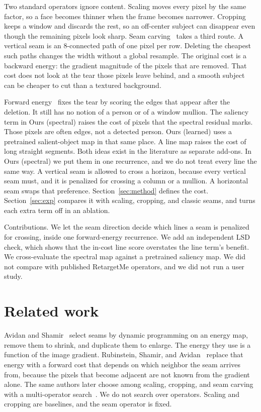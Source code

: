 \documentclass[10pt,twocolumn,letterpaper]{article}
\begin{document}
Two standard operators ignore content.
Scaling moves every pixel by the same factor, so a face becomes thinner when the frame becomes narrower.
Cropping keeps a window and discards the rest, so an off-center subject can disappear even though the remaining pixels look sharp.
Seam carving~\cite{avidan2007seam} takes a third route.
A vertical seam is an 8-connected path of one pixel per row.
Deleting the cheapest such paths changes the width without a global resample.
The original cost is a backward energy: the gradient magnitude of the pixels that are removed.
That cost does not look at the tear those pixels leave behind, and a smooth subject can be cheaper to cut than a textured background.

Forward energy~\cite{rubinstein2008improved} fixes the tear by scoring the edges that appear after the deletion.
It still has no notion of a person or of a window mullion.
The saliency term in Ours (spectral) raises the cost of pixels that the spectral residual marks. Those pixels are often edges, not a detected person.
Ours (learned) uses a pretrained salient-object map in that same place.
A line map raises the cost of long straight segments.
Both ideas exist in the literature as separate add-ons.
In Ours (spectral) we put them in one recurrence, and we do not treat every line the same way.
A vertical seam is allowed to cross a horizon, because every vertical seam must, and it is penalized for crossing a column or a mullion.
A horizontal seam swaps that preference.
Section~\ref{sec:method} defines the cost.
Section~\ref{sec:exp} compares it with scaling, cropping, and classic seams, and turns each extra term off in an ablation.

Contributions.
We let the seam direction decide which lines a seam is penalized for crossing, inside one forward-energy recurrence.
We add an independent LSD check, which shows that the in-cost line score overstates the line term's benefit.
We cross-evaluate the spectral map against a pretrained saliency map.
We did not compare with published RetargetMe operators, and we did not run a user study.

\section{Related work}
Avidan and Shamir~\cite{avidan2007seam} select seams by dynamic programming on an energy map, remove them to shrink, and duplicate them to enlarge.
The energy they use is a function of the image gradient.
Rubinstein, Shamir, and Avidan~\cite{rubinstein2008improved} replace that energy with a forward cost that depends on which neighbor the seam arrives from, because the pixels that become adjacent are not known from the gradient alone.
The same authors later choose among scaling, cropping, and seam carving with a multi-operator search~\cite{rubinstein2009multi}.
We do not search over operators.
Scaling and cropping are baselines, and the seam operator is fixed.
\end{document}
